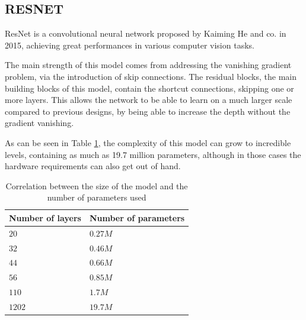 \subsection{RESNET}
\label{subsec:relatedsec2subsec2}
\par ResNet is a convolutional neural network proposed by Kaiming He and co. in 2015, achieving great performances in various computer vision tasks.
\par The main strength of this model comes from addressing the vanishing gradient problem, via the introduction of skip connections. The residual blocks, the main building blocks of this model, contain the shortcut connections, skipping one or more layers. This allows the network to be able to learn on a much larger scale compared to previous designs, by being able to increase the depth without the gradient vanishing. \cite{he2015deep}
\par As can be seen in Table \ref{ResNetTable}, the complexity of this model can grow to incredible levels, containing as much as 19.7 million parameters, although in those cases the hardware requirements can also get out of hand.

\begin{table}[htbp]
\begin{center}
\begin{tabular}
{|p{120pt}|p{120pt}|}
\hline
Number of layers & Number of parameters\\
\hline 
\hline $20$ & $0.27M$ \\
\hline $32$ & $0.46M$ \\
\hline $44$ & $0.66M$ \\
\hline $56$ & $0.85M$ \\
\hline $110$ & $1.7M$ \\
\hline $1202$ & $19.7M$ \\
\hline
\end{tabular}
\end{center}
\caption{Correlation between the size of the model and the number of parameters used \cite{he2015deep}}
\label{ResNetTable}
\end{table}

